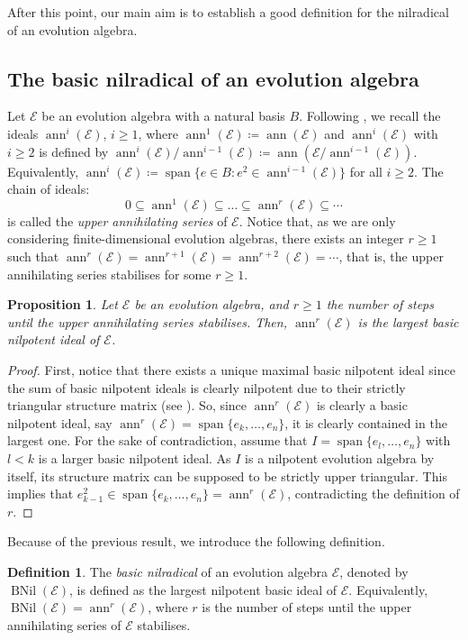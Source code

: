 \documentclass[12pt,reqno]{amsart}
\newtheorem{proposition}[theorem]{Proposition}
\theoremstyle{definition}
\newtheorem{definition}[theorem]{Definition}
\theoremstyle{remark}
\DeclareMathOperator{\ann}{ann}
\DeclareMathOperator{\spa}{span}
\DeclareMathOperator{\bnil}{BNil}
\numberwithin{equation}{section}
\begin{document}
After this point, our main aim is to establish a good definition for the nilradical of an evolution algebra. 
\subsection{The basic nilradical of an evolution algebra}

Let $\mathcal{E}$ be an evolution algebra with a natural basis $B$. Following \cite[Definition 3.3]{EL_16}, we recall the ideals $\ann^i(\mathcal{E})$, $i\geq1$, where $\ann^1(\mathcal{E})\coloneqq\ann(\mathcal{E})$ and $\ann^i(\mathcal{E})$ with $i\geq2$ is defined by $\ann^i(\mathcal{E})/\ann^{i-1}(\mathcal{E})\coloneqq\ann(\mathcal{E}/\ann^{i-1}(\mathcal{E}))$. Equivalently, $\ann^i(\mathcal{E})\coloneqq\spa\{e\in B\colon e^2\in\ann^{i-1}(\mathcal{E})\}$ for all $i\geq2$. The chain of ideals:
\[0\subseteq\ann^1(\mathcal{E})\subseteq\dots\subseteq\ann^{r}(\mathcal{E})\subseteq\cdots\]
is called the \textit{upper annihilating series} of $\mathcal{E}$. Notice that, as we are only considering finite-dimensional evolution algebras, there exists an integer $r\geq1$ such that $\ann^r(\mathcal{E})=\ann^{r+1}(\mathcal{E})=\ann^{r+2}(\mathcal{E})=\cdots$, that is, the upper annihilating series stabilises for some $r\geq1$.
\begin{proposition}
Let $\mathcal{E}$ be an evolution algebra, and $r\geq1$ the number of steps until the upper annihilating series stabilises. Then, $\ann^r(\mathcal{E})$ is the largest basic nilpotent ideal of $\mathcal{E}$.
\end{proposition}
\begin{proof}
First, notice that there exists a unique maximal basic nilpotent ideal since the sum of basic nilpotent ideals is clearly nilpotent due to their strictly triangular structure matrix (see \cite[Theorem 2.7]{CLOR_14}). So, since $\ann^r(\mathcal{E})$ is clearly a basic nilpotent ideal, say $\ann^r(\mathcal{E})=\spa\{e_k,\dots,e_n\}$, it is clearly contained in the largest one.
For the sake of contradiction, assume that $I=\spa\{e_l,\dots,e_n\}$ with $l<k$ is a larger basic nilpotent ideal. As $I$ is a nilpotent evolution algebra by itself, its structure matrix can be supposed to be strictly upper triangular. This implies that $e_{k-1}^2\in\spa\{e_k,\dots,e_n\}=\ann^r(\mathcal{E})$, contradicting the definition of $r$.
\end{proof}
Because of the previous result, we introduce the following definition.
\begin{definition}\label{def:basic_nilrad}
The \textit{basic nilradical} of an evolution algebra $\mathcal{E}$, denoted by $\bnil(\mathcal{E})$, is defined as the largest nilpotent basic ideal of $\mathcal{E}$. Equivalently, $\bnil(\mathcal{E})=\ann^r(\mathcal{E})$, where $r$ is the number of steps until the upper annihilating series of $\mathcal{E}$ stabilises.
\end{definition}
\end{document}
